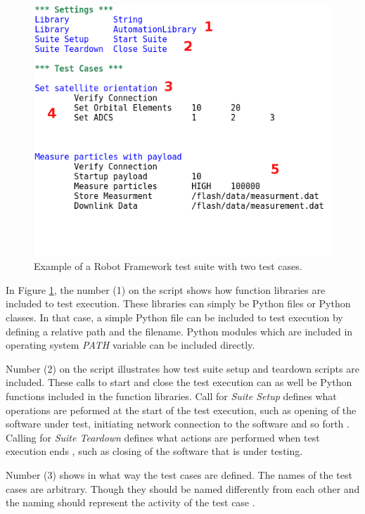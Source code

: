 \documentclass[english,12pt,a4paper,pdftex,elec,utf8]{aaltothesis}
\begin{document}
\begin{figure}[h!]
\centering
\includegraphics[scale=0.55]{robotexamplemod}
\caption{Example of a Robot Framework test suite with two test cases.}
\label{robotexample}
\end{figure}
In Figure \ref{robotexample}, the number (1) on the script shows how function libraries are included to test execution. These libraries can simply be Python files or Python classes. In that case, a simple Python file can be included to test execution by defining a relative path and the filename. Python modules which are included in operating system \textit{PATH} variable can be included directly.\par 
Number (2) on the script illustrates how test suite setup and teardown scripts are included. These calls to start and close the test execution can as well be Python functions included in the function libraries. Call for \textit{Suite Setup} defines what operations are peformed at the start of the test execution, such as opening of the software under test, initiating network connection to the software and so forth \cite{robotuserguide}. Calling for \textit{Suite Teardown} defines what actions are performed when test execution ends \cite{robotuserguide}, such as closing of the software that is under testing.\par 
Number (3) shows in what way the test cases are defined. The names of the test cases are arbitrary. Though they should be named differently from each other and the naming should represent the activity of the test case \cite{robotuserguide}. \par 
\end{document}
